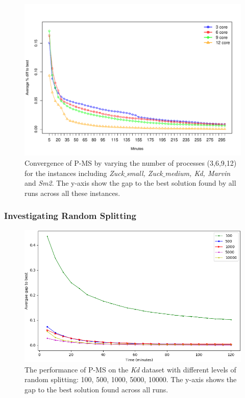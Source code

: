 \documentclass[authoryear,11pt,square,number,times,super,comma]{elsarticle}
\begin{document}
\begin{figure}[htbp]
  \includegraphics[width=15cm]{CoreConvergenceMS}
  \centering
  \caption{Convergence of P-MS by varying the number of processes (3,6,9,12) for the instances including \emph{Zuck$\_$small, Zuck$\_$medium, Kd, Marvin} and \emph{Sm2}. 
  The y-axis show the gap to the best solution found by all runs across all these instances.}
  \label{fig:concores}
\end{figure}

\subsubsection{Investigating Random Splitting}

\begin{figure}[htbp]
  \includegraphics[width=14cm]{kd_ransplit}
  \centering
  \caption{The performance of P-MS on the \emph{Kd} dataset with different levels of random splitting: 100, 500, 1000, 5000, 10000. The y-axis shows the gap to the best solution found across all runs.}
  \label{fig:kd_rs}
\end{figure}
\end{document}
